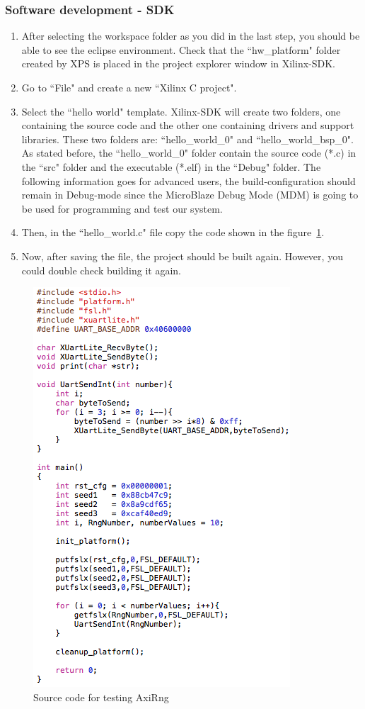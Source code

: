 \subsubsection{Software development - SDK}
\begin{enumerate}
\item After selecting the workspace folder as you did in the last step, you should be able to see the eclipse environment. Check that the ``hw\_platform" folder created by XPS is placed in the project explorer window in Xilinx-SDK. 
\item Go to ``File" and create a new ``Xilinx C project".
\item Select the ``hello world" template. Xilinx-SDK will create two folders, one containing the source code and the other one containing drivers and support libraries. These two folders are: ``hello\_world\_0" and ``hello\_world\_bsp\_0". As stated before, the ``hello\_world\_0" folder contain the source code (*.c) in the ``src" folder and the executable (*.elf) in the ``Debug" folder. The following information goes for advanced users, the build-configuration should remain in Debug-mode since the MicroBlaze Debug Mode (MDM) is going to be used for programming and test our system.
\item Then, in the ``hello\_world.c" file copy the code shown in the figure~\ref{f7}. 
\item Now, after saving the file, the project should be built again. However, you could double check building it again.
\end{enumerate}

\begin{figure}[!h]
\includegraphics[scale=0.75]{images/axiRngSwCode.png}
\caption{Source code for testing AxiRng}
\label{f7}
\end{figure}


